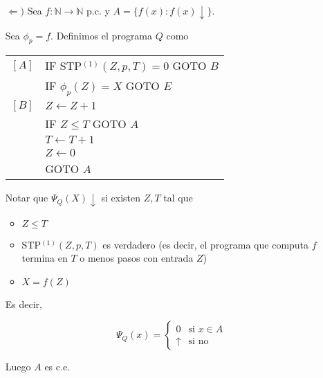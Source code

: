 \begin{questions}
\begin{solution}
\begin{itemize}
    \begin{itemize}
      \item Si $x\in A \Rightarrow$ existe $t$ tal que $P(x,t) \Rightarrow f(\langle x,t \rangle) = x$
      \item Sea $x$ tal que $f(u)=x$ para alg\'un $u$. Entonces $x=a$ o bien $u$ es de la forma $u=\langle x,t \rangle$, con $P(x,t)$. Luego $x\in A$.
    \end{itemize}
  
    {\it Demostraci\'on de} (1): Sea $A=\{x : \phi_e(x)\downarrow\}$. Entonces $x\in A$ cuando en alg\'un tiempo $t$, el programa $e$ con entrada $x$ termina, i.e. 
    
    $$A=\{x : (\exists t)\text{STP}^{(1)}(x,e,t)\}=\{x : (\exists t)P(x,t)\}$$
    
    \item[$\Leftarrow)$] Sea $f : \mathbb{N} \rightarrow \mathbb{N}$ p.c. y $A=\{f(x) : f(x)\downarrow\}$. 
    
    Sea $\phi_p=f$. Definimos el programa $Q$ como
    
    \vspace{0.5cm}
    \begin{tabular}{rl}
      $[A]$ & IF STP$^{(1)}(Z,p,T)=0$ GOTO $B$ \\
	    & IF $\phi_p(Z)=X$ GOTO $E$\\
      $[B]$ & $Z\leftarrow Z+1$\\
	    & IF $Z\leq T$ GOTO $A$\\
	    & $T\leftarrow T+1$\\
	    & $Z\leftarrow 0$\\
	    & GOTO $A$\\
    \end{tabular}
    \vspace{0.5cm}
    
    Notar que $\Psi_Q(X)\downarrow$  si existen $Z,T$ tal que
    
    \begin{itemize}
      \item $Z\leq T$
      \item STP$^{(1)}(Z,p,T)$ es verdadero (es decir, el programa que computa $f$ termina en $T$ o menos pasos con entrada $Z$)
      \item $X=f(Z)$
    \end{itemize}
    
    Es decir, 
    
    $$
    \Psi_Q(x) = \left\{
    \begin{array}{cl}
    0 & \mbox{si } x\in A \\
    \uparrow & \mbox{si no} 
    \end{array}\right.
    $$
    
    Luego $A$ es c.e.
\end{itemize}

\end{solution}

\end{questions}